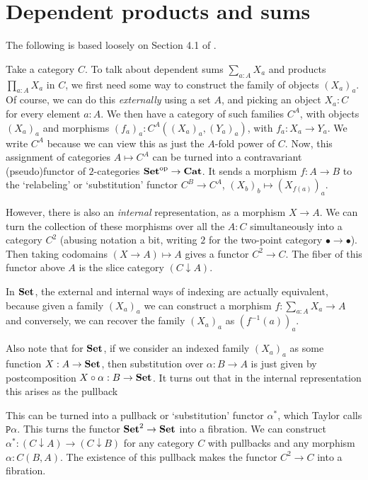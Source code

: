 \section{Dependent products and sums}\label{sec:dependent-products}
The following is based loosely on Section 4.1 of \autocite{taylor}.

Take a category $ C $. To talk about dependent sums $ \sum_{a: A} X_a $ and products $ \prod_{a: A} X_a $ in $ C $, we first need some way to construct the family of objects $ (X_a)_a $. Of course, we can do this \textit{externally} using a set $ A $, and picking an object $ X_a : C $ for every element $ a : A $. We then have a category of such families $ C^A $, with objects $ (X_a)_a $ and morphisms $ (f_a)_a: C^A((X_a)_a, (Y_a)_a) $, with $ f_a: X_a \to Y_a $. We write $ C^A $ because we can view this as just the $ A $-fold power of $ C $. Now, this assignment of categories $ A \mapsto C^A $ can be turned into a contravariant (pseudo)functor of $ 2 $-categories $ \mathbf{Set}^{\text{op}} \to \mathbf{Cat} $. It sends a morphism $ f: A \to B $ to the `relabeling' or `substitution' functor $ C^B \to C^A $, $ (X_b)_b \mapsto (X_{f(a)})_a $.

However, there is also an \textit{internal} representation, as a morphism $ X \to A $. We can turn the collection of these morphisms over all the $ A : C $ simultaneously into a category $ C^2 $ (abusing notation a bit, writing $ 2 $ for the two-point category $ \bullet \to \bullet $). Then taking codomains $ (X \to A) \mapsto A $ gives a functor $ C^2 \to C $. The fiber of this functor above $ A $ is the slice category $ (C \downarrow A) $.

In $ \mathbf{Set} $, the external and internal ways of indexing are actually equivalent, because given a family $ (X_a)_a $ we can construct a morphism $ f: \sum_{a : A} X_a \to A $ and conversely, we can recover the family $ (X_a)_a $ as $ (f^{-1}(a))_a $.

Also note that for $ \mathbf{Set} $, if we consider an indexed family $ (X_a)_a $ as some function $ X: A \to \mathbf{Set} $, then substitution over $ \alpha: B \to A $ is just given by postcomposition $ X \circ \alpha: B \to \mathbf{Set} $. It turns out that in the internal representation this arises as the pullback
\begin{center}
\end{center}
This can be turned into a pullback or `substitution' functor $ \alpha^* $, which Taylor calls $ \mathtt{P}\alpha $. This turns the functor $ \mathbf{Set}^2 \to \mathbf{Set} $ into a fibration. We can construct $ \alpha^* : (C \downarrow A) \to (C \downarrow B) $ for any category $ C $ with pullbacks and any morphism $ \alpha: C(B, A) $. The existence of this pullback makes the functor $ C^2 \to C $ into a fibration.

